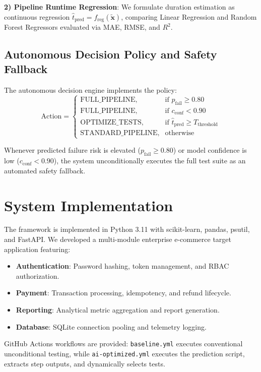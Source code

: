 \documentclass[conference]{IEEEtran}
\begin{document}
\textbf{2) Pipeline Runtime Regression}: We formulate duration estimation as continuous regression $\hat{t}_{\text{pred}} = f_{\text{reg}}(\tilde{\mathbf{x}})$, comparing Linear Regression and Random Forest Regressors evaluated via MAE, RMSE, and $R^2$.

\subsection{Autonomous Decision Policy and Safety Fallback}
The autonomous decision engine implements the policy:
\begin{equation}
\text{Action} = 
\begin{cases}
\text{FULL\_PIPELINE}, & \text{if } p_{\text{fail}} \ge 0.80 \\
\text{FULL\_PIPELINE}, & \text{if } c_{\text{conf}} < 0.90 \\
\text{OPTIMIZE\_TESTS}, & \text{if } \hat{t}_{\text{pred}} \ge T_{\text{threshold}} \\
\text{STANDARD\_PIPELINE}, & \text{otherwise}
\end{cases}
\end{equation}

Whenever predicted failure risk is elevated ($p_{\text{fail}} \ge 0.80$) or model confidence is low ($c_{\text{conf}} < 0.90$), the system unconditionally executes the full test suite as an automated safety fallback.

\section{System Implementation}
The framework is implemented in Python 3.11 with scikit-learn, pandas, psutil, and FastAPI. We developed a multi-module enterprise e-commerce target application featuring:
\begin{itemize}
    \item \textbf{Authentication}: Password hashing, token management, and RBAC authorization.
    \item \textbf{Payment}: Transaction processing, idempotency, and refund lifecycle.
    \item \textbf{Reporting}: Analytical metric aggregation and report generation.
    \item \textbf{Database}: SQLite connection pooling and telemetry logging.
\end{itemize}

GitHub Actions workflows are provided: \texttt{baseline.yml} executes conventional unconditional testing, while \texttt{ai-optimized.yml} executes the prediction script, extracts step outputs, and dynamically selects tests.
\end{document}
